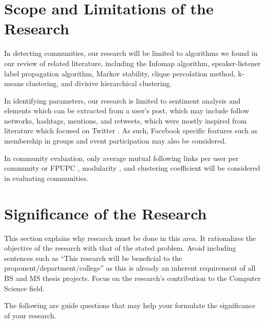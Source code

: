 \section{Scope and Limitations of the Research}
\label{sec:scopelimitations}

In detecting communities, our research will be limited to algorithms we found in our review of related literature, including the Infomap algorithm, speaker-listener label propagation algorithm, Markov stability, clique percolation method, k-means clustering, and divisive hierarchical clustering.

In identifying parameters, our research is limited to sentiment analysis and elements which can be extracted from a user’s post, which may include follow networks, hashtags, mentions, and retweets, which were mostly inspired from literature which focused on Twitter \cite{Deitrick:2013,Zhang:2012,Lim:2012:1}. As such, Facebook specific features such as membership in groups and event participation may also be considered.

In community evaluation, only average mutual following links per user per community or FPUPC \cite{Zhang:2012}, modularity \cite{Deitrick:2013},  and clustering coefficient \cite{Lim:2012:1} will be considered in evaluating communities.

\section{Significance of the Research}
\label{sec:significance}

This section explains why research must be done in this area.  It rationalizes the objective of the research with that of the stated problem. 
Avoid including sentences such as ``This research will be beneficial to the proponent/department/college'' as this is already an inherent
requirement of all BS and MS thesis projects.  Focus on the research's contribution to the Computer Science field.

The following are guide questions that may help your formulate the significance of your research. 


